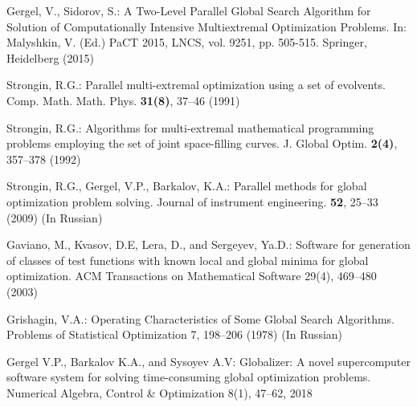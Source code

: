\documentclass[runningheads]{llncs}
\begin{document}
\begin{thebibliography}{107}
Gergel, V., Sidorov, S.: A Two-Level Parallel Global Search Algorithm for Solution of Computationally Intensive Multiextremal Optimization Problems. In: Malyshkin, V. (Ed.) PaCT 2015, LNCS, vol. 9251, pp. 505-515. Springer, Heidelberg (2015)

Strongin, R.G.: Parallel multi-extremal optimization using a set of evolvents. Comp. Math. Math. Phys. \textbf{31(8)}, 37--46 (1991)

Strongin, R.G.: Algorithms for multi-extremal mathematical programming problems employing the set of joint space-filling curves. J. Global Optim. \textbf{2(4)}, 357--378 (1992)

Strongin, R.G., Gergel, V.P., Barkalov, K.A.: Parallel methods for global optimization problem solving. Journal of instrument engineering. \textbf{52}, 25--33 (2009) (In Russian)

Gaviano, M., Kvasov, D.E, Lera, D., and Sergeyev, Ya.D.: Software for generation of classes of test functions with known local and global minima for global optimization. ACM Transactions on Mathematical Software 29(4), 469--480 (2003)

Grishagin, V.A.: Operating Characteristics of Some Global Search Algorithms. Problems of Statistical Optimization 7, 198--206 (1978) (In Russian)

Gergel V.P., Barkalov K.A., and Sysoyev A.V: Globalizer: A novel supercomputer software system for solving time-consuming global optimization problems. Numerical Algebra, Control \& Optimization 8(1), 47--62, 2018


\end{thebibliography}
\end{document}

